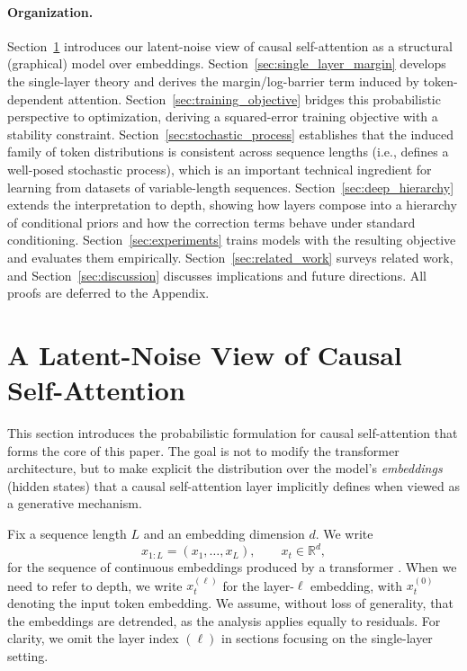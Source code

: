 \documentclass[11pt]{article}
\begin{document}
\paragraph{Organization.}
Section~\ref{sec:graphical_model} introduces our latent-noise view of causal self-attention as a structural (graphical) model over embeddings.
Section~\ref{sec:single_layer_margin} develops the single-layer theory and derives the margin/log-barrier term induced by token-dependent attention.
Section~\ref{sec:training_objective} bridges this probabilistic perspective to optimization, deriving a squared-error training objective with a stability constraint.
Section~\ref{sec:stochastic_process} establishes that the induced family of token distributions is consistent across sequence lengths (i.e., defines a well-posed stochastic process), which is an important technical ingredient for learning from datasets of variable-length sequences.
Section~\ref{sec:deep_hierarchy} extends the interpretation to depth, showing how layers compose into a hierarchy of conditional priors and how the correction terms behave under standard conditioning.
Section~\ref{sec:experiments} trains models with the resulting objective and evaluates them empirically.
Section~\ref{sec:related_work} surveys related work, and Section~\ref{sec:discussion} discusses implications and future directions.
All proofs are deferred to the Appendix.

\section{A Latent-Noise View of Causal Self-Attention}
\label{sec:graphical_model}

This section introduces the probabilistic formulation for causal self-attention that forms the core of this paper. The goal is not to modify the transformer architecture, but to make explicit the distribution over the model's \emph{embeddings} (hidden states) that a causal self-attention layer implicitly defines when viewed as a generative mechanism.

Fix a sequence length $L$ and an embedding dimension $d$. We write
\[
x_{1:L} = (x_1,\dots,x_L), \qquad x_t \in \mathbb{R}^d,
\]
for the sequence of continuous embeddings produced by a transformer \citep{VaswaniShPaUsJoGoKaPo17,BrownMaRyEtAl20}. When we need to refer to depth, we write $x_t^{(\ell)}$ for the layer-$\ell$ embedding, with $x_t^{(0)}$ denoting the input token embedding. We assume, without loss of generality, that the embeddings are detrended, as the analysis applies equally to residuals. For clarity, we omit the layer index $(\ell)$ in sections focusing on the single-layer setting.
\end{document}
